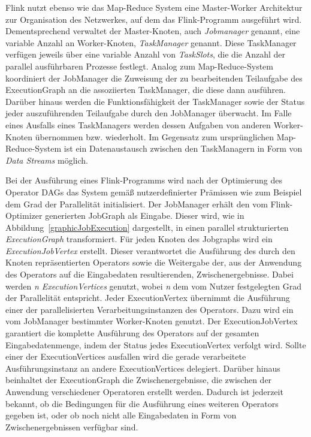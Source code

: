 Flink nutzt ebenso wie das Map-Reduce System eine Master-Worker Architektur zur Organisation des Netzwerkes, auf dem das Flink-Programm ausgeführt wird. Dementsprechend verwaltet der Master-Knoten, auch \textit{Jobmanager} genannt, eine variable Anzahl an Worker-Knoten, \textit{TaskManager} genannt. Diese TaskManager verfügen jeweils über eine variable Anzahl von \textit{TaskSlots}, die die Anzahl der parallel ausführbaren Prozesse festlegt. Analog zum Map-Reduce-System koordiniert der JobManager die Zuweisung der zu bearbeitenden Teilaufgabe des ExecutionGraph an die assoziierten TaskManager, die diese dann ausführen. Darüber hinaus werden die Funktionsfähigkeit der TaskManager sowie der Status jeder auszuführenden Teilaufgabe durch den JobManager überwacht. Im Falle eines Ausfalls eines TaskManagers werden dessen Aufgaben von anderen Worker-Knoten übernommen bzw. wiederholt. Im Gegensatz zum ursprünglichen Map-Reduce-System ist ein Datenaustausch zwischen den TaskManagern in Form von \textit{Data Streams} möglich. 

Bei der Ausführung eines Flink-Programms wird nach der Optimierung des Operator DAGs das System gemäß nutzerdefinierter Prämissen wie zum Beispiel dem Grad der Parallelität initialisiert. Der JobManager erhält den vom Flink-Optimizer generierten JobGraph als Eingabe. Dieser wird, wie in Abbildung~\ref{graphicJobExecution} dargestellt, in einen parallel strukturierten \textit{ExecutionGraph} transformiert. Für jeden Knoten des Jobgraphs wird ein \textit{ExecutionJobVertex} erstellt. Dieser verantwortet die Ausführung des durch den Knoten repräsentierten Operators sowie die Weitergabe der, aus der Anwendung des Operators auf die Eingabedaten resultierenden, Zwischenergebnisse. Dabei werden \textit{n ExecutionVertices} genutzt, wobei \textit{n} dem vom Nutzer festgelegten Grad der Parallelität entspricht. Jeder ExecutionVertex übernimmt die Ausführung einer der parallelisierten Verarbeitungsinstanzen des Operators. Dazu wird ein vom JobManager bestimmter Worker-Knoten genutzt. Der ExecutionJobVertex garantiert die komplette Ausführung des Operators auf der gesamten Eingabedatenmenge, indem der Status jedes ExecutionVertex verfolgt wird. Sollte einer der ExecutionVertices ausfallen wird die gerade verarbeitete Ausführungsinstanz an andere ExecutionVertices delegiert. Darüber hinaus beinhaltet der ExecutionGraph die Zwischenergebnisse, die zwischen der Anwendung verschiedener Operatoren erstellt werden. Dadurch ist jederzeit bekannt, ob die Bedingungen für die Ausführung eines weiteren Operators gegeben ist, oder ob noch nicht alle Eingabedaten in Form von Zwischenergebnissen verfügbar sind.

